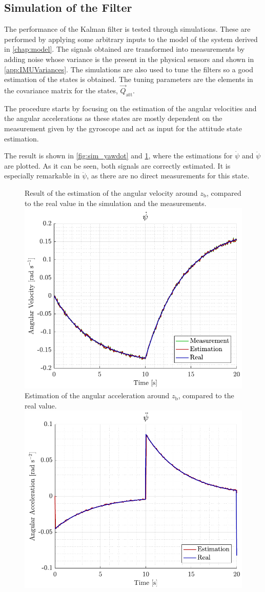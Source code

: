 \subsection{Simulation of the Filter}
The performance of the Kalman filter is tested through simulations. These are performed by applying some arbitrary inputs to the model of the system derived in \autoref{chap:model}. The signals obtained are transformed into measurements by adding noise whose variance is the present in the physical sensors and shown in \autoref{app:IMUVariances}. The simulations are also used to tune the filters so a good estimation of the states is obtained. The tuning parameters are the elements in the covariance matrix for the states, $\vec{Q}_\mathrm{att}$. 

The procedure starts by focusing on the estimation of the angular velocities and the angular accelerations as these states are mostly dependent on the measurement given by the gyroscope and act as input for the attitude state estimation.

The result is shown in \autoref{fig:sim_yawdot} and \ref{fig:sim_yawddot}, where the estimations for $\dot{\psi}$ and $\ddot{\psi}$ are plotted. As it can be seen, both signals are correctly estimated. It is especially remarkable in $\ddot{\psi}$, as there are no direct measurements for this state.
\begin{figure}[H]
	\captionbox 
	{   
		Result of the estimation of the angular velocity around $z_\mathrm{b}$, compared to the real value in the simulation and the measurements.
		\label{fig:sim_yawdot}
	}                                                        
	{  
		\includegraphics[width=.45\textwidth]{figures/sim_yawdot}         
	}        
	\hspace{5pt}                 
	\captionbox  
	{      
		Estimation of the angular acceleration around $z_\mathrm{b}$, compared to the real value.
		\label{fig:sim_yawddot}
	}                                                        
	{
		\includegraphics[width=.45\textwidth]{figures/sim_yawddot}
	}
\end{figure}

